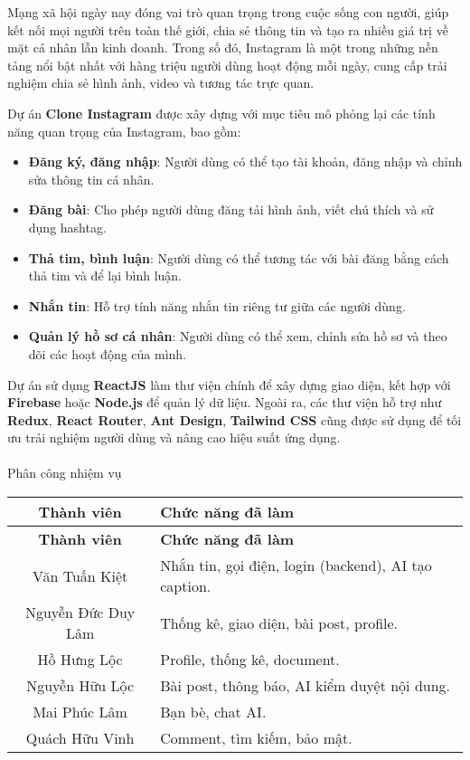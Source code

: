 

\vspace{0.5cm} %

Mạng xã hội ngày nay đóng vai trò quan trọng trong cuộc sống con người, giúp kết nối mọi người trên toàn thế giới, chia sẻ thông tin và tạo ra nhiều giá trị về mặt cá nhân lẫn kinh doanh. Trong số đó, Instagram là một trong những nền tảng nổi bật nhất với hàng triệu người dùng hoạt động mỗi ngày, cung cấp trải nghiệm chia sẻ hình ảnh, video và tương tác trực quan.

Dự án \textbf{Clone Instagram} được xây dựng với mục tiêu mô phỏng lại các tính năng quan trọng của Instagram, bao gồm:
\begin{itemize}
    \renewcommand{\labelitemi}{-} %
    \item \textbf{Đăng ký, đăng nhập}: Người dùng có thể tạo tài khoản, đăng nhập và chỉnh sửa thông tin cá nhân.
    \item \textbf{Đăng bài}: Cho phép người dùng đăng tải hình ảnh, viết chú thích và sử dụng hashtag.
    \item \textbf{Thả tim, bình luận}: Người dùng có thể tương tác với bài đăng bằng cách thả tim và để lại bình luận.
    \item \textbf{Nhắn tin}: Hỗ trợ tính năng nhắn tin riêng tư giữa các người dùng.
    \item \textbf{Quản lý hồ sơ cá nhân}: Người dùng có thể xem, chỉnh sửa hồ sơ và theo dõi các hoạt động của mình.
\end{itemize}

Dự án sử dụng \textbf{ReactJS} làm thư viện chính để xây dựng giao diện, kết hợp với \textbf{Firebase} hoặc \textbf{Node.js} để quản lý dữ liệu. Ngoài ra, các thư viện hỗ trợ như \textbf{Redux}, \textbf{React Router}, \textbf{Ant Design}, \textbf{Tailwind CSS} cũng được sử dụng để tối ưu trải nghiệm người dùng và nâng cao hiệu suất ứng dụng.\\ \\

Phân công nhiệm vụ\\

\begin{longtable}{|c|p{12cm}|}
    \hline
    \textbf{Thành viên} & \textbf{Chức năng đã làm} \\
    \hline
    \endfirsthead
    \hline
    \textbf{Thành viên} & \textbf{Chức năng đã làm} \\
    \hline
    \endhead
    \hline
    \endfoot

    Văn Tuấn Kiệt & Nhắn tin, gọi điện, login (backend), AI tạo caption. \\
    \hline
    Nguyễn Đức Duy Lâm & Thống kê, giao diện, bài post, profile. \\
    \hline
    Hồ Hưng Lộc & Profile, thống kê, document. \\
    \hline
    Nguyễn Hữu Lộc & Bài post, thông báo, AI kiểm duyệt nội dung. \\
    \hline
    Mai Phúc Lâm & Bạn bè, chat AI. \\
    \hline
    Quách Hữu Vinh & Comment, tìm kiếm, bảo mật. \\
    \hline
\end{longtable}

